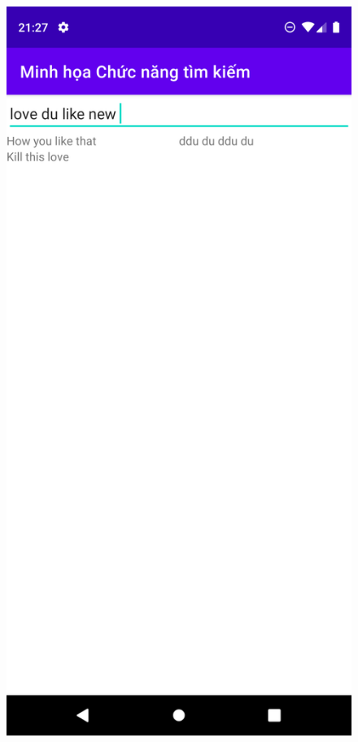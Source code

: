 \documentclass{beamer}
\begin{document}
\begin{frame}
    \begin{columns}
        \begin{figure}
            \centering
            \includegraphics[height=0.7\textheight]{images/40.png}

\end{figure}
\end{columns}
\end{frame}
\end{document}
